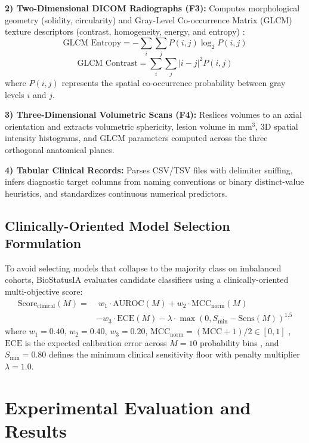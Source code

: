 \documentclass[conference]{IEEEtran}
\begin{document}
\textbf{2) Two-Dimensional DICOM Radiographs (F3):} Computes morphological geometry (solidity, circularity) and Gray-Level Co-occurrence Matrix (GLCM) texture descriptors (contrast, homogeneity, energy, and entropy) \cite{baker2022radiomics, haralick1973}:
\begin{equation}
\text{GLCM Entropy} = -\sum_{i}\sum_{j} P(i,j) \log_2 P(i,j)
\end{equation}
\begin{equation}
\text{GLCM Contrast} = \sum_{i}\sum_{j} |i - j|^2 P(i,j)
\end{equation}
where $P(i,j)$ represents the spatial co-occurrence probability between gray levels $i$ and $j$.

\textbf{3) Three-Dimensional Volumetric Scans (F4):} Reslices volumes to an axial orientation and extracts volumetric sphericity, lesion volume in $\text{mm}^3$, 3D spatial intensity histograms, and GLCM parameters computed across the three orthogonal anatomical planes.

\textbf{4) Tabular Clinical Records:} Parses CSV/TSV files with delimiter sniffing, infers diagnostic target columns from naming conventions or binary distinct-value heuristics, and standardizes continuous numerical predictors.

\subsection{Clinically-Oriented Model Selection Formulation}
To avoid selecting models that collapse to the majority class on imbalanced cohorts, BioStatusIA evaluates candidate classifiers using a clinically-oriented multi-objective score:
\begin{align}
\text{Score}_{\text{clinical}}(M) = & \; w_1 \cdot \text{AUROC}(M) + w_2 \cdot \text{MCC}_{\text{norm}}(M) \nonumber \\
& - w_3 \cdot \text{ECE}(M) - \lambda \cdot \max\left(0, S_{\min} - \text{Sens}(M)\right)^{1.5}
\end{align}
where $w_1 = 0.40$, $w_2 = 0.40$, $w_3 = 0.20$, $\text{MCC}_{\text{norm}} = (\text{MCC} + 1)/2 \in [0, 1]$ \cite{mcc1975}, $\text{ECE}$ is the expected calibration error across $M=10$ probability bins \cite{guo2017calibration}, and $S_{\min} = 0.80$ defines the minimum clinical sensitivity floor with penalty multiplier $\lambda = 1.0$.

\section{Experimental Evaluation and Results}
\end{document}
